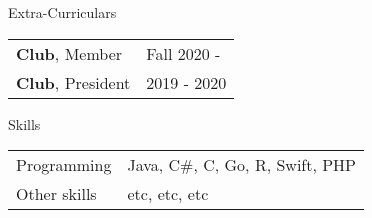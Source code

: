 \documentclass{gohsu-resume}
\begin{document}
\begin{resumeSection}{Extra-Curriculars}
	
	\begin{tabular}{p{}p{}}
		{\textbf{Club}, Member} & {Fall 2020 - } \\[0.5em]
		
		{\textbf{Club}, President} & {2019 - 2020}
	\end{tabular}	
		
\end{resumeSection}


\begin{resumeSection}{Skills}
	
	\begin{tabular}{p{}p{}}
	{Programming} & {Java, C\#, C, Go, R, Swift, PHP}\\ 
	{Other skills} & {etc, etc, etc}
	\end{tabular}

\end{resumeSection}
\end{document}
